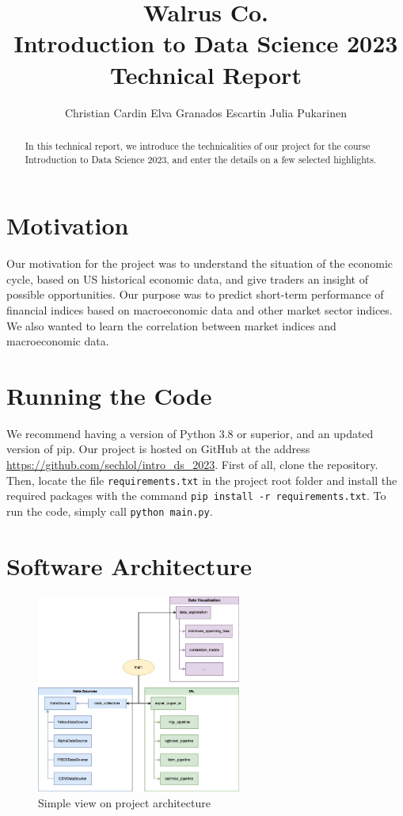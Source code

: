 \documentclass[10pt]{article} %
\title{Walrus Co. \\
Introduction to Data Science 2023 \\
Technical Report}
\author{\name Christian Cardin
      \AND
      \name Elva Granados Escartin
      \AND
      \name Julia Pukarinen}
\begin{document}
\maketitle

\begin{abstract}
In this technical report, we introduce the technicalities of our project for the course Introduction to Data Science 2023, and enter the details on a few selected highlights.
\end{abstract}

\section{Motivation}

Our motivation for the project was to understand the situation of the economic cycle, based on US historical economic data, and give traders an insight of possible opportunities. Our purpose was to predict short-term performance of financial indices based on macroeconomic data and other market sector indices. We also wanted to learn the correlation between market indices and macroeconomic data.

\section{Running the Code}
We recommend having a version of Python 3.8 or superior, and an updated version of pip. Our project is hosted on GitHub at the address \href{https://github.com/sechlol/intro_ds_2023}{https://github.com/sechlol/intro\_ds\_2023}. First of all, clone the repository. Then, locate the file \texttt{requirements.txt} in the project root folder and install the required packages with the command \texttt{pip install -r requirements.txt}. To run the code, simply call \texttt{python main.py}.

\section{Software Architecture}

\begin{figure}[h]
  \begin{center}
    \includegraphics[width=0.6\textwidth]{img/arch.jpg}
  \end{center}
  \caption{Simple view on project architecture}
  \label{fig:arch}
  \end{figure}
\end{document}
